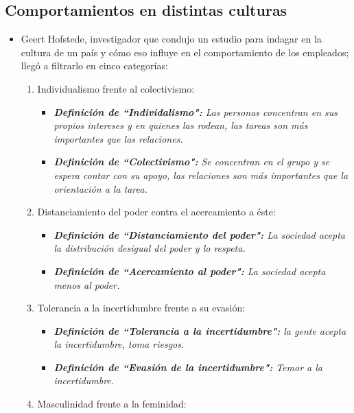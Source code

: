 \documentclass{article}
\begin{document}
\subsection{Comportamientos en distintas culturas}
\begin{itemize}
    \item Geert Hofstede, investigador que condujo un estudio para indagar en la cultura de un país y cómo eso influye en el comportamiento de los empleados; llegó a filtrarlo en cinco categorías:
        \begin{enumerate}
            \item Individualismo frente al colectivismo:
                \begin{itemize}
                    \item \emph{\textbf{Definición de ``Individalismo":} Las personas concentran en sus propios intereses y en quienes las rodean, las tareas son más importantes que las relaciones.}
                    \item \emph{\textbf{Definición de ``Colectivismo":} Se concentran en el grupo y se espera contar con su apoyo, las relaciones son más importantes que la orientación a la tarea.}
                \end{itemize}
            \item Distanciamiento del poder contra el acercamiento a éste:
                \begin{itemize}
                    \item \emph{\textbf{Definición de ``Distanciamiento del poder":} La sociedad acepta la distribución desigual del poder y lo respeta.}
                    \item \emph{\textbf{Definición de ``Acercamiento al poder":} La sociedad acepta menos al poder.}
                \end{itemize}
            \item Tolerancia a la incertidumbre frente a su evasión:
                \begin{itemize}
                    \item \emph{\textbf{Definición de ``Tolerancia a la incertidumbre":} la gente acepta la incertidumbre, toma riesgos.}
                    \item \emph{\textbf{Definición de ``Evasión de la incertidumbre":} Temor a la incertidumbre.}
                \end{itemize}
            \item Masculinidad frente a la feminidad:
                \begin{itemize}

\end{itemize}
\end{enumerate}
\end{itemize}
\end{document}
